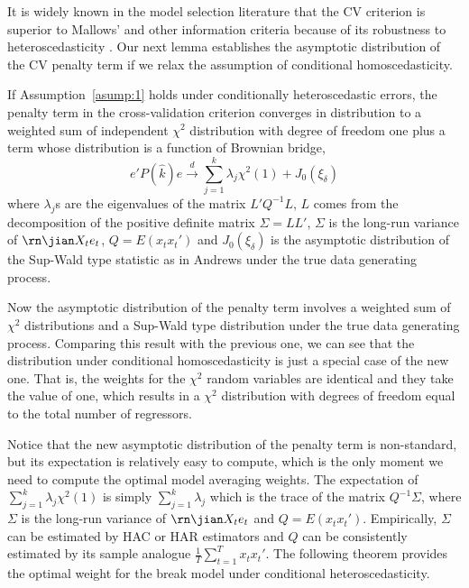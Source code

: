 It is widely known in the model selection literature that the CV criterion is superior to Mallows' and other information criteria because of its robustness to heteroscedasticity \cite{andrews_JE1991}. Our next lemma establishes the asymptotic distribution of the CV penalty term if we relax the assumption of conditional homoscedasticity.
\begin{lemma} \label{thm:2}
If Assumption~\ref{asump:1} holds under conditionally heteroscedastic errors, the penalty term in the cross-validation criterion converges in distribution to a weighted sum of independent $\chi^2$ distribution with degree of freedom one plus a term whose distribution is a function of Brownian bridge,
\begin{equation} \label{eq:4}
	e'P(\hat{k})e \stackrel{d}{\rightarrow} \sum_{j=1}^{k} \lambda_j \chi^2(1) + J_0(\xi_{\delta})
\end{equation}
where $\lambda_j$s are the eigenvalues of the matrix $L'Q^{-1}L$, $L$ comes from the decomposition of the positive definite matrix $\Sigma = LL'$, $\Sigma$ is the long-run variance of $\rn\jian X_t e_t$, $Q = E(x_t x_t')$ and $J_0(\xi_{\delta})$ is the asymptotic distribution of the Sup-Wald type statistic as in Andrews \cite{andrews93} under the true data generating process.
\end{lemma}
Now the asymptotic distribution of the penalty term involves a weighted sum of $\chi^2$ distributions and a Sup-Wald type distribution under the true data generating process. Comparing this result with the previous one, we can see that the distribution under conditional homoscedasticity is just a special case of the new one. That is, the weights for the $\chi^2$ random variables are identical and they take the value of one, which results in a $\chi^2$ distribution with degrees of freedom equal to the total number of regressors.

Notice that the new asymptotic distribution of the penalty term is non-standard, but its expectation is relatively easy to compute, which is the only moment we need to compute the optimal model averaging weights. The expectation of $\sum_{j=1}^{k} \lambda_j \chi^2(1)$ is simply $\sum_{j=1}^{k} \lambda_j$ which is the trace of the matrix $Q^{-1} \Sigma$, where $\Sigma$ is the long-run variance of $\rn\jian X_t e_t$ and $Q = E(x_t x_t')$. Empirically, $\Sigma$ can be estimated by HAC or HAR estimators and $Q$ can be consistently estimated by its sample analogue $\frac{1}{T}\sum_{t=1}^{T}x_t x_t'$. The following theorem provides the optimal weight for the break model under conditional heteroscedasticity.

